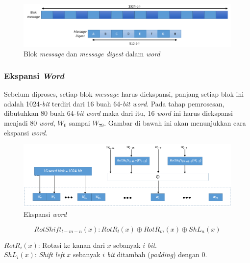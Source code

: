 \begin{figure}[ht]
	\includegraphics[scale=0.6]{Gambar/message_block_digest_as_words}
	\centering
	\caption{Blok \textit{message} dan \textit{message digest} dalam \textit{word}}
\end{figure}

\subsubsection{Ekspansi \textit{Word}}
\label{sssec:ekspansi_word}
Sebelum diproses, setiap blok \textit{message} harus diekspansi, panjang setiap blok ini adalah 1024-\textit{bit} terdiri dari 16 buah 64-\textit{bit word}. Pada tahap pemrosesan, dibutuhkan 80 buah 64-\textit{bit word} maka dari itu, 16 \textit{word} ini harus diekspansi menjadi 80 \textit{word}, \begin{math}W_0\end{math} sampai \begin{math}W_79\end{math}. Gambar di bawah ini akan menunjukkan cara ekspansi \textit{word}.

\begin{figure}[ht]
	\includegraphics[scale=0.4]{Gambar/word_expansion}
	\centering
	\caption{Ekspansi \textit{word}}
\end{figure}

\begin{displaymath}
	RotShift_{l-m-n}(x):RotR_l(x) \oplus RotR_m(x) \oplus ShL_n(x)
\end{displaymath}

\noindent \begin{math}RotR_i(x)\end{math}: Rotasi ke kanan dari \begin{math}x\end{math} sebanyak \begin{math}i\end{math} \textit{bit}.\\
\begin{math}ShL_i(x)\end{math}: \textit{Shift left} \begin{math}x\end{math} sebanyak \begin{math}i\end{math} \textit{bit} ditambah (\textit{padding}) dengan 0.

